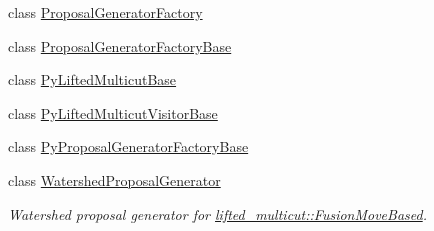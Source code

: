 \begin{DoxyCompactItemize}
\item 
class \hyperlink{classnifty_1_1graph_1_1opt_1_1lifted__multicut_1_1ProposalGeneratorFactory}{Proposal\+Generator\+Factory}
\item 
class \hyperlink{classnifty_1_1graph_1_1opt_1_1lifted__multicut_1_1ProposalGeneratorFactoryBase}{Proposal\+Generator\+Factory\+Base}
\item 
class \hyperlink{classnifty_1_1graph_1_1opt_1_1lifted__multicut_1_1PyLiftedMulticutBase}{Py\+Lifted\+Multicut\+Base}
\item 
class \hyperlink{classnifty_1_1graph_1_1opt_1_1lifted__multicut_1_1PyLiftedMulticutVisitorBase}{Py\+Lifted\+Multicut\+Visitor\+Base}
\item 
class \hyperlink{classnifty_1_1graph_1_1opt_1_1lifted__multicut_1_1PyProposalGeneratorFactoryBase}{Py\+Proposal\+Generator\+Factory\+Base}
\item 
class \hyperlink{classnifty_1_1graph_1_1opt_1_1lifted__multicut_1_1WatershedProposalGenerator}{Watershed\+Proposal\+Generator}
\begin{DoxyCompactList}\small\item\em Watershed proposal generator for \hyperlink{classnifty_1_1graph_1_1opt_1_1lifted__multicut_1_1FusionMoveBased}{lifted\+\_\+multicut\+::\+Fusion\+Move\+Based}. \end{DoxyCompactList}\end{DoxyCompactItemize}
